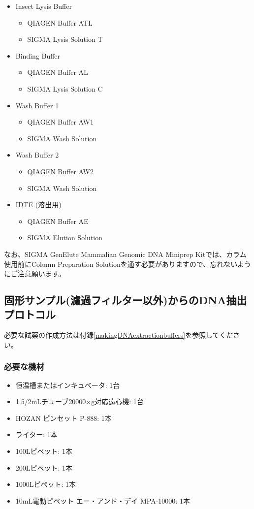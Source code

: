 \documentclass[titlepage,10pt,a4paper]{jsbook}
\begin{document}
\begin{itemize}
\item Insect Lysis Buffer
\begin{itemize}
\item QIAGEN Buffer ATL
\item SIGMA Lysis Solution T
\end{itemize}
\item Binding Buffer
\begin{itemize}
\item QIAGEN Buffer AL
\item SIGMA Lysis Solution C
\end{itemize}
\item Wash Buffer 1
\begin{itemize}
\item QIAGEN Buffer AW1
\item SIGMA Wash Solution
\end{itemize}
\item Wash Buffer 2
\begin{itemize}
\item QIAGEN Buffer AW2
\item SIGMA Wash Solution
\end{itemize}
\item IDTE (溶出用)
\begin{itemize}
\item QIAGEN Buffer AE
\item SIGMA Elution Solution
\end{itemize}
\end{itemize}

なお、SIGMA GenElute Mammalian Genomic DNA Miniprep Kitでは、カラム使用前にColumn Preparation Solutionを通す必要がありますので、忘れないようにご注意願います。

\subsection{固形サンプル(濾過フィルター以外)からのDNA抽出プロトコル}

必要な試薬の作成方法は付録\ref{makingDNAextractionbuffers}を参照してください。

\subsubsection{必要な機材}
\begin{itemize}
\item 恒温槽またはインキュベータ: 1台
\item 1.5/2mLチューブ20000×g対応遠心機: 1台
\item HOZAN ピンセット P-888: 1本
\item ライター: 1本
\item 100{\textmu}Lピペット: 1本
\item 200{\textmu}Lピペット: 1本
\item 1000{\textmu}Lピペット: 1本
\item 10mL電動ピペット エー・アンド・デイ MPA-10000: 1本
\end{itemize}
\end{document}
